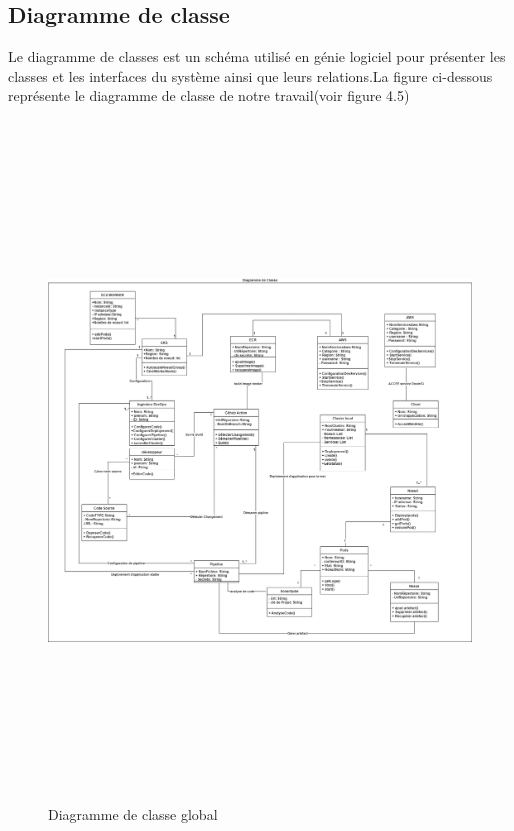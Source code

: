 \subsection{\selectfont\Large Diagramme de classe}
\textsf{\selectfont{} Le diagramme de classes est un schéma utilisé en génie logiciel pour présenter les classes et les interfaces du système ainsi que leurs relations.La figure ci-dessous représente le 
diagramme de classe de notre travail(voir figure 4.5)\cite{13}}
\begin{figure}[H]
  \begin{center}
  
      \includegraphics[width=18cm,height=18cm]{ClassDiagram.drawio.png}

  \end{center}
  
  \caption{Diagramme de classe global}
\end{figure}
